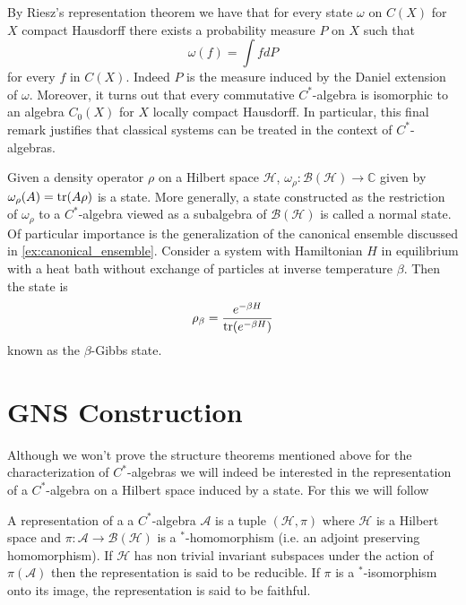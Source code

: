 \begin{example}
By Riesz's representation theorem \cite{Hewitt1975} we have that for every state $\omega$ on $C(X)$ for $X$ compact Hausdorff there exists a probability measure $P$ on $X$ such that
\begin{equation}
\omega (f)=\int fdP
\end{equation}    
for every $f$ in $C(X)$. Indeed $P$ is the measure induced by the Daniel extension of $\omega$. Moreover, it turns out that every commutative $C^*$-algebra is isomorphic to an algebra $C_0(X)$ for $X$ locally compact Hausdorff\cite{Bratteli1997}. In particular, this final remark justifies that classical systems can be treated in the context of $C^*$-algebras. 
\end{example}

\begin{example}\label{ex:Gibbs}
Given a density operator $\rho$ on a Hilbert space $\mathcal{H}$, $\omega_\rho:\mathcal{B} (\mathcal{H})\rightarrow\mathbb{C}$ given by $\omega_\rho(A)=\operatorname{tr}(A\rho)$ is a state. More generally, a state constructed as the restriction of $\omega_\rho$ to a $C^*$-algebra viewed as a subalgebra of $\mathcal{B}(\mathcal{H})$ is called a normal state. Of particular importance is the generalization of the canonical ensemble discussed in \ref{ex:canonical_ensemble}. Consider a system with Hamiltonian $H$ in equilibrium with a heat bath without exchange of particles at inverse temperature $\beta$. Then the state is
\begin{equation}
\rho_\beta=\frac{e^{-\beta H}}{\operatorname{tr}(e^{-\beta H})}
\end{equation}
known as the $\beta$-Gibbs state\cite{Kubo1965}\cite{Duvenhage1999}. 
\end{example}

\section{GNS Construction}

Although we won't prove the structure theorems mentioned above for the characterization of $C^*$-algebras we will indeed be interested in the representation of a $C^*$-algebra on a Hilbert space induced by a state. For this we will follow \cite{Bratteli1997} 

\begin{definition}
A representation of a a $C^*$-algebra $\mathcal{A}$ is a tuple $(\mathcal{H},\pi)$ where $\mathcal{H}$ is a Hilbert space and $\pi:\mathcal{A}\rightarrow \mathcal{B}(\mathcal{H})$ is a $^*$-homomorphism (i.e. an adjoint preserving homomorphism). If $\mathcal{H}$ has non trivial invariant subspaces under the action of $\pi(\mathcal{A})$ then the representation is said to be reducible. If $\pi$ is a $^*$-isomorphism onto its image, the representation is said to be faithful. 
\end{definition}

